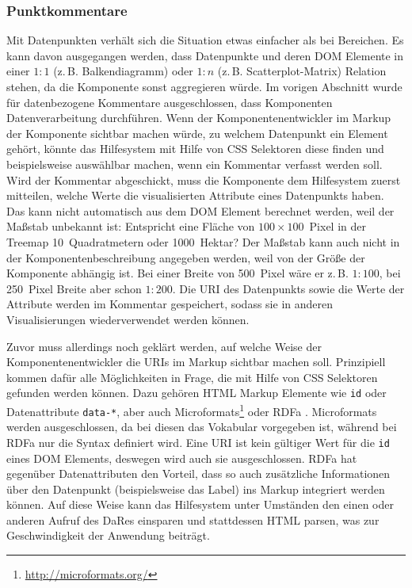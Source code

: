 \documentclass[
	headsepline,
	footsepline,
	fontsize=12pt,
	bibliography=totoc
]{scrbook}
\begin{document}
\subsubsection{Punktkommentare}


Mit Datenpunkten verhält sich die Situation etwas einfacher als bei Bereichen. Es kann davon ausgegangen werden, dass Datenpunkte und deren DOM Elemente in einer $1:1$ (z.\,B. Balkendiagramm) oder $1:n$ (z.\,B. Scatterplot-Matrix) Relation stehen, da die Komponente sonst aggregieren würde. Im vorigen Abschnitt wurde für datenbezogene Kommentare ausgeschlossen, dass Komponenten Datenverarbeitung durchführen. Wenn der Komponentenentwickler im Markup der Komponente sichtbar machen würde, zu welchem Datenpunkt ein Element gehört, könnte das Hilfesystem mit Hilfe von CSS Selektoren diese finden und beispielsweise auswählbar machen, wenn ein Kommentar verfasst werden soll. Wird der Kommentar abgeschickt, muss die Komponente dem Hilfesystem zuerst mitteilen, welche Werte die visualisierten Attribute eines Datenpunkts haben. Das kann nicht automatisch aus dem DOM Element berechnet werden, weil der Maßstab unbekannt ist: Entspricht eine Fläche von $100\times100$~Pixel in der Treemap 10~Quadratmetern oder 1000~Hektar? Der Maßstab kann auch nicht in der Komponentenbeschreibung angegeben werden, weil von der Größe der Komponente abhängig ist. Bei einer Breite von 500~Pixel wäre er z.\,B. $1:100$, bei 250~Pixel Breite aber schon $1:200$. Die URI des Datenpunkts sowie die Werte der Attribute werden im Kommentar gespeichert, sodass sie in anderen Visualisierungen wiederverwendet werden können.


Zuvor muss allerdings noch geklärt werden, auf welche Weise der Komponentenentwickler die URIs im Markup sichtbar machen soll. Prinzipiell kommen dafür alle Möglichkeiten in Frage, die mit Hilfe von CSS Selektoren gefunden werden können. Dazu gehören HTML Markup Elemente wie \texttt{id} oder Datenattribute \texttt{data-*}, aber auch Microformats\footnote{\url{http://microformats.org/}} oder RDFa \cite{W3C2012}. Microformats werden ausgeschlossen, da bei diesen das Vokabular vorgegeben ist, während bei RDFa nur die Syntax definiert wird. Eine URI ist kein gültiger Wert für die \texttt{id} eines DOM Elements, deswegen wird auch sie ausgeschlossen. RDFa hat gegenüber Datenattributen den Vorteil, dass so auch zusätzliche Informationen über den Datenpunkt (beispielsweise das Label) ins Markup integriert werden können. Auf diese Weise kann das Hilfesystem unter Umständen den einen oder anderen Aufruf des DaRes einsparen und stattdessen HTML parsen, was zur Geschwindigkeit der Anwendung beiträgt.
\end{document}
